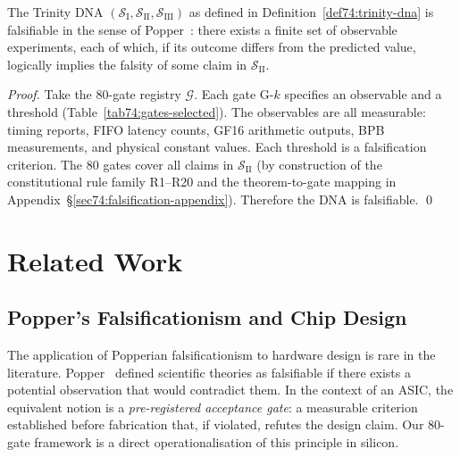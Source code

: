 \begin{theorem}
\label{thm74:dna-falsifiability}
The Trinity DNA $(\mathcal{S}_{\mathrm{I}},\mathcal{S}_{\mathrm{II}},
\mathcal{S}_{\mathrm{III}})$ as defined in
Definition~\ref{def74:trinity-dna} is falsifiable in the sense of
Popper~\cite{popper1959}: there exists a finite set of observable
experiments, each of which, if its outcome differs from the predicted
value, logically implies the falsity of some claim in
$\mathcal{S}_{\mathrm{II}}$.
\end{theorem}
\begin{proof}
Take the 80-gate registry $\mathcal{G}$.  Each gate G-$k$ specifies an
observable and a threshold (Table~\ref{tab74:gates-selected}).  The
observables are all measurable: timing reports, FIFO latency counts, GF16
arithmetic outputs, BPB measurements, and physical constant values.
Each threshold is a falsification criterion.  The 80 gates cover all
claims in $\mathcal{S}_{\mathrm{II}}$ (by construction of the
constitutional rule family R1--R20 and the theorem-to-gate mapping in
Appendix~\S\ref{sec74:falsification-appendix}).  Therefore the DNA is
falsifiable.
\qed
\end{proof}


\section{Related Work}
\label{sec74:related}

\subsection{Popper's Falsificationism and Chip Design}
\label{sec74:related-popper}

The application of Popperian falsificationism to hardware design is
rare in the literature.  Popper~\cite{popper1959} defined scientific
theories as falsifiable if there exists a potential observation that
would contradict them.  In the context of an ASIC, the equivalent
notion is a \emph{pre-registered acceptance gate}: a measurable
criterion established before fabrication that, if violated, refutes
the design claim.  Our 80-gate framework is a direct operationalisation
of this principle in silicon.


